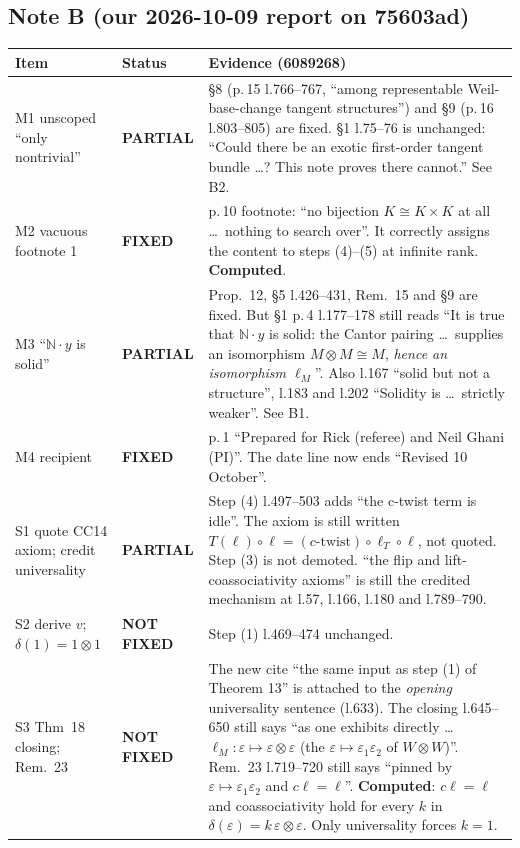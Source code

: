 \documentclass[11pt]{article}
\newcommand{\N}{\mathbb{N}}
\begin{document}
\subsection*{Note B (our 2026-10-09 report on 75603ad)}
\begin{longtable}{p{3.0cm}p{2.1cm}p{9.9cm}}
\toprule
Item & Status & Evidence (6089268)\\\midrule\endhead
M1 unscoped ``only nontrivial'' & \textbf{PARTIAL} & \S8 (p.\,15 l.766--767, ``among representable Weil-base-change tangent structures'') and \S9 (p.\,16 l.803--805) are fixed. \S1 l.75--76 is unchanged: ``Could there be an exotic first-order tangent bundle \dots? This note proves there cannot.'' See B2.\\
M2 vacuous footnote 1 & \textbf{FIXED} & p.\,10 footnote: ``no bijection $K\cong K\times K$ at all \dots\ nothing to search over''. It correctly assigns the content to steps (4)--(5) at infinite rank. \textbf{Computed}.\\
M3 ``$\N\cdot y$ is solid'' & \textbf{PARTIAL} & Prop.~12, \S5 l.426--431, Rem.~15 and \S9 are fixed. But \S1 p.\,4 l.177--178 still reads ``It is true that $\N\cdot y$ is solid: the Cantor pairing \dots\ supplies an isomorphism $M\otimes M\cong M$, \emph{hence an isomorphism $\ell_M$}''. Also l.167 ``solid but not a structure'', l.183 and l.202 ``Solidity is \dots\ strictly weaker''. See B1.\\
M4 recipient & \textbf{FIXED} & p.\,1 ``Prepared for Rick (referee) and Neil Ghani (PI)''. The date line now ends ``Revised 10 October''.\\
S1 quote CC14 axiom; credit universality & \textbf{PARTIAL} & Step (4) l.497--503 adds ``the c-twist term is idle''. The axiom is still written $T(\ell)\circ\ell=(c\text{-twist})\circ\ell_T\circ\ell$, not quoted. Step (3) is not demoted. ``the flip and lift-coassociativity axioms'' is still the credited mechanism at l.57, l.166, l.180 and l.789--790.\\
S2 derive $v$; $\delta(1)=1\otimes1$ & \textbf{NOT FIXED} & Step (1) l.469--474 unchanged.\\
S3 Thm~18 closing; Rem.~23 & \textbf{NOT FIXED} & The new cite ``the same input as step (1) of Theorem 13'' is attached to the \emph{opening} universality sentence (l.633). The closing l.645--650 still says ``as one exhibits directly \dots\ $\ell_M:\varepsilon\mapsto\varepsilon\otimes\varepsilon$ (the $\varepsilon\mapsto\varepsilon_1\varepsilon_2$ of $W\otimes W$)''. Rem.~23 l.719--720 still says ``pinned by $\varepsilon\mapsto\varepsilon_1\varepsilon_2$ and $c\ell=\ell$''. \textbf{Computed}: $c\ell=\ell$ and coassociativity hold for every $k$ in $\delta(\varepsilon)=k\,\varepsilon\otimes\varepsilon$. Only universality forces $k=1$.\\

\end{longtable}
\end{document}
